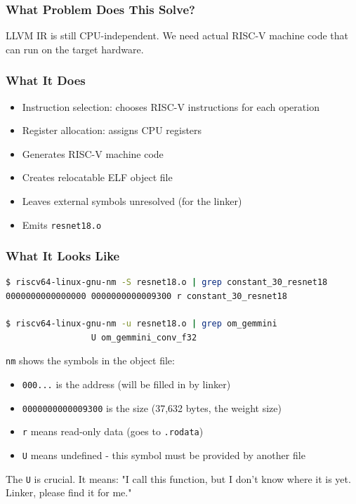 \documentclass[12pt,a4paper]{article}
\begin{document}
\subsubsection{What Problem Does This Solve?}
LLVM IR is still CPU-independent. We need actual RISC-V machine code that can run on the target hardware.

\subsubsection{What It Does}
\begin{itemize}
  \item Instruction selection: chooses RISC-V instructions for each operation
  \item Register allocation: assigns CPU registers
  \item Generates RISC-V machine code
  \item Creates relocatable ELF object file
  \item Leaves external symbols unresolved (for the linker)
  \item Emits \texttt{resnet18.o}
\end{itemize}

\subsubsection{What It Looks Like}
\begin{lstlisting}[language=bash,caption=Checking the Object File]
$ riscv64-linux-gnu-nm -S resnet18.o | grep constant_30_resnet18
0000000000000000 0000000000009300 r constant_30_resnet18

$ riscv64-linux-gnu-nm -u resnet18.o | grep om_gemmini
                 U om_gemmini_conv_f32
\end{lstlisting}

\begin{analogyenv}
\texttt{nm} shows the symbols in the object file:
\begin{itemize}
  \item \texttt{000...} is the address (will be filled in by linker)
  \item \texttt{0000000000009300} is the size (37,632 bytes, the weight size)
  \item \texttt{r} means read-only data (goes to \texttt{.rodata})
  \item \texttt{U} means undefined - this symbol must be provided by another file
\end{itemize}

The \texttt{U} is crucial. It means: "I call this function, but I don't know where it is yet. Linker, please find it for me."
\end{analogyenv}
\end{document}
